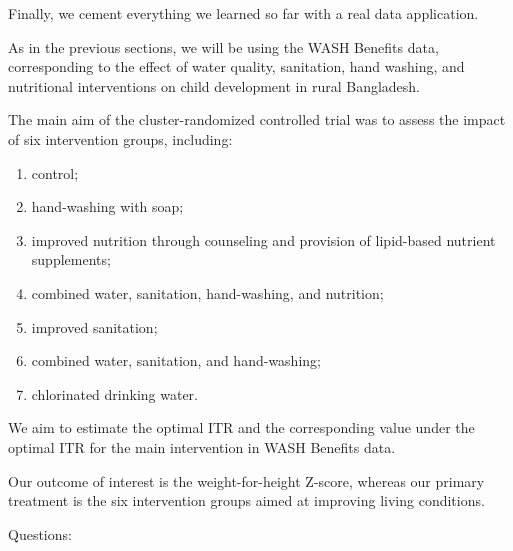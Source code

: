 \documentclass[12pt, krantz2,]{krantz}
\theoremstyle{definition}
\theoremstyle{definition}
\theoremstyle{definition}
\newcommand{\1}{\mathbbm{1}}
\begin{document}
Finally, we cement everything we learned so far with a real data application.

As in the previous sections, we will be using the WASH Benefits data,
corresponding to the effect of water quality, sanitation, hand washing, and
nutritional interventions on child development in rural Bangladesh.

The main aim of the cluster-randomized controlled trial was to assess the
impact of six intervention groups, including:

\begin{enumerate}
\def\labelenumi{\arabic{enumi}.}
\item
  control;
\item
  hand-washing with soap;
\item
  improved nutrition through counseling and provision of lipid-based nutrient
  supplements;
\item
  combined water, sanitation, hand-washing, and nutrition;
\item
  improved sanitation;
\item
  combined water, sanitation, and hand-washing;
\item
  chlorinated drinking water.
\end{enumerate}

We aim to estimate the optimal ITR and the corresponding value under the optimal
ITR for the main intervention in WASH Benefits data.

Our outcome of interest is the weight-for-height Z-score, whereas our primary
treatment is the six intervention groups aimed at improving living conditions.

Questions:
\end{document}
